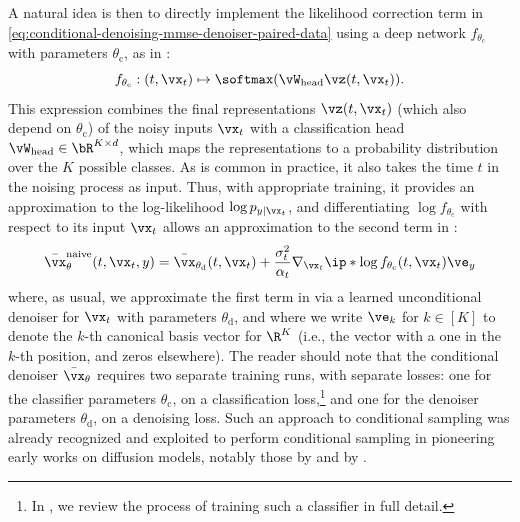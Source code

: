 \documentclass[../../book-main.tex]{subfiles}
\begin{document}
A natural idea is then to directly implement the likelihood correction term in
\eqref{eq:conditional-denoising-mmse-denoiser-paired-data} using a deep network
$f_{\theta_{\mathrm{c}}}$ with parameters $\theta_{\mathrm{c}}$, as in
:
\begin{equation}
    f_{\theta_{\mathrm{c}}} : (t, \vx_t) \mapsto \softmax(\vW_{\mathrm{head}}
    \vz(t, \vx_t)).
\end{equation}
This expression combines the final representations $\vz(t, \vx_t)$
(which also depend on
$\theta_{\mathrm{c}}$) of the noisy inputs
$\vx_t$ with a classification head $\vW_{\mathrm{head}} \in \bR^{K
\times d}$, which maps the
representations to a probability distribution over the $K$ possible classes.
As is common in practice, it also takes the time $t$ in the noising process as
input.
Thus, with appropriate training, it provides an approximation to the
log-likelihood
$\log p_{y \mid \vx_t}$, and differentiating $\log f_{\theta_{\mathrm{c}}}$ with
respect to its input $\vx_t$
allows an approximation to the second term in
:
\begin{equation}\label{eq:conditional-denoising-mmse-denoiser-paired-data-approx}
    \bar{\vx}_{\theta}^{\mathrm{naive}}(t, \vx_t, y)
    =
    \bar{\vx}_{\theta_{\mathrm{d}}}(t, \vx_t)
    + \frac{\sigma_t^2}{\alpha_t}
    \nabla_{\vx_t}
    \ip*{
        \log f_{\theta_{\mathrm{c}}}(t, \vx_t)
    }{
        \ve_{y}
    }
\end{equation}
where, as usual, we approximate the first term in
 via a learned
unconditional denoiser for $\vx_t$ with parameters $\theta_{\mathrm{d}}$, and
where we write $\ve_k$ for $k \in [K]$ to denote the $k$-th canonical basis
vector for $\R^K$ (i.e., the vector with
a one in the $k$-th position, and zeros elsewhere).
The reader should note that the conditional denoiser $\bar{\vx}_{\theta}$
requires two separate training runs, with separate losses: one for the
classifier parameters $\theta_{\mathrm{c}}$, on a classification
loss,\footnote{In , we review the process of training such
a classifier in full detail.} and one for the denoiser parameters
$\theta_{\mathrm{d}}$, on a denoising loss. Such an approach to conditional
sampling was already recognized and exploited to perform conditional sampling in
pioneering early works on diffusion models, notably those by
\citet{Sohl-Dickstein2015} and by \citet{song2020score}.
\end{document}
